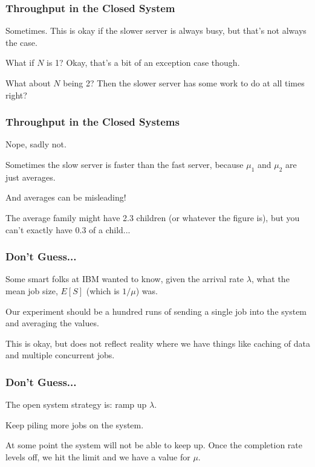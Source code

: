 \begin{frame}
\frametitle{Throughput in the Closed System}



Sometimes. This is okay if the slower server is always busy, but that's not always the case. 

What if $N$ is 1? Okay, that's a bit of an exception case though. 

What about $N$ being 2? Then the slower server has some work to do at all times right?

\end{frame}



\begin{frame}
\frametitle{Throughput in the Closed Systems}

Nope, sadly not. 

Sometimes the slow server is faster than the fast server, because $\mu_{1}$ and $\mu_{2}$ are just averages. 

And averages can be misleading! 

The average family might have 2.3 children (or whatever the figure is), but you can't exactly have 0.3 of a child...

\end{frame}



\begin{frame}
\frametitle{Don't Guess...}
Some smart folks at IBM wanted to know, given the arrival rate $\lambda$, what the mean job size, $E[S]$ (which is $1/\mu$) was. 

Our experiment should be a hundred runs of sending a single job into the system and averaging the values. 

This is okay, but does not reflect reality where we have things like caching of data and multiple concurrent jobs. 

\end{frame}



\begin{frame}
\frametitle{Don't Guess...}

The open system strategy is: ramp up $\lambda$. 

Keep piling more jobs on the system. 

At some point the system will not be able to keep up. Once the completion rate levels off, we hit the limit and we have a value for $\mu$.


\end{frame}



